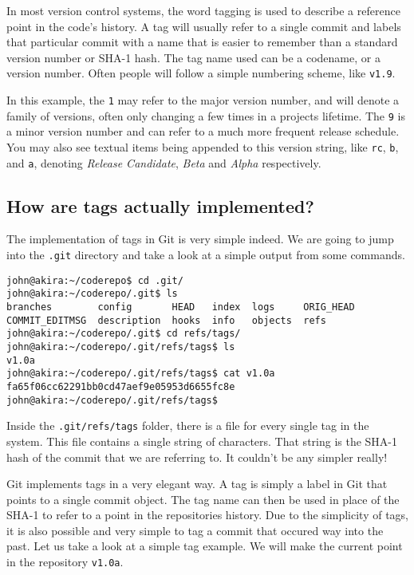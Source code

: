 In most version control systems, the word tagging is used to describe a reference point in the code's history.  A tag will usually refer to a single commit and labels that particular commit with a name that is easier to remember than a standard version number or SHA-1 hash.  The tag name used can be a codename, or a version number.  Often people will follow a simple numbering scheme, like \texttt{v1.9}.  

In this example, the \texttt{1} may refer to the major version number, and will denote a family of versions, often only changing a few times in a projects lifetime.  The \texttt{9} is a minor version number and can refer to a much more frequent release schedule.  You may also see textual items being appended to this version string, like \texttt{rc}, \texttt{b}, and \texttt{a}, denoting \emph{Release Candidate}, \emph{Beta} and \emph{Alpha} respectively.

\begin{framed}
\subsection{How are tags actually implemented?}
The implementation of tags in Git is very simple indeed.  We are going to jump into the \texttt{.git} directory and take a look at a simple output from some commands.
\begin{Verbatim}[frame=leftline,framerule=1mm,fontsize=\relsize{-3}] 
john@akira:~/coderepo$ cd .git/
john@akira:~/coderepo/.git$ ls
branches        config       HEAD   index  logs     ORIG_HEAD
COMMIT_EDITMSG  description  hooks  info   objects  refs
john@akira:~/coderepo/.git$ cd refs/tags/
john@akira:~/coderepo/.git/refs/tags$ ls
v1.0a
john@akira:~/coderepo/.git/refs/tags$ cat v1.0a 
fa65f06cc62291bb0cd47aef9e05953d6655fc8e
john@akira:~/coderepo/.git/refs/tags$ 
\end{Verbatim}
Inside the \texttt{.git/refs/tags} folder, there is a file for every single tag in the system.  This file contains a single string of characters.  That string is the SHA-1 hash of the commit that we are referring to.  It couldn't be any simpler really!
\end{framed}

Git implements tags in a very elegant way.  A tag is simply a label in Git that points to a single commit object.  The tag name can then be used in place of the SHA-1 to refer to a point in the repositories history.  Due to the simplicity of tags, it is also possible and very simple to tag a commit that occured way into the past.  Let us take a look at a simple tag example.  We will make the current point in the repository \texttt{v1.0a}.

